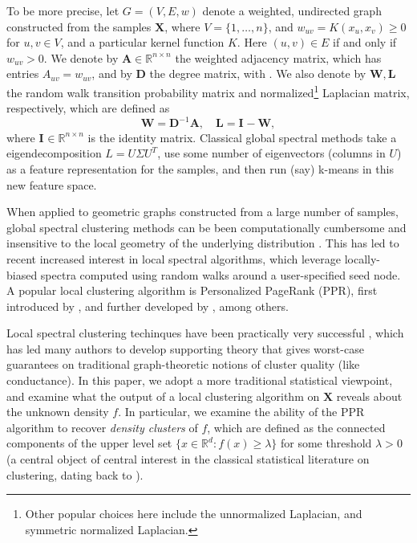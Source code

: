 \documentclass{article}
\newcommand{\Reals}{\mathbb{R}}
\newcommand{\Rd}{\Reals^d}
\newcommand{\1}{\mathbf{1}}
\newcommand{\Abf}{\mathbf{A}}
\newcommand{\Xbf}{\mathbf{X}}
\newcommand{\Wbf}{\mathbf{W}}
\newcommand{\Lbf}{\mathbf{L}}
\newcommand{\Dbf}{\mathbf{D}}
\newcommand{\Ibf}[1]{\mathbf{I}_{#1}}
\theoremstyle{aldenthm}
\theoremstyle{aldenrmrk}
\begin{document}
To be more precise, let $G=(V,E,w)$ denote a weighted, undirected graph  
constructed from the samples $\mathbf{X}$, where $V=\{1,\ldots,n\}$, and $w_{uv}
= K(x_u,x_v) \geq 0$ for $u,v \in V$, and a particular kernel function $K$.
Here $(u,v) \in E$ if and only if $w_{uv} > 0$.  We denote by $\Abf \in
\Reals^{n \times n}$ the weighted adjacency matrix, which has entries
$A_{uv}=w_{uv}$, and by $\Dbf$ the degree matrix, with 
\smash{$\Dbf_{uu} = \sum_{v \in V} \Abf_{uv}$}.  We also denote by $\Wbf,\Lbf$
the random walk transition probability matrix and normalized\footnote{Other
  popular choices here include the unnormalized Laplacian, and symmetric
  normalized Laplacian.} 
Laplacian matrix, respectively, which are defined as
$$
\Wbf = \Dbf^{-1}\Abf, \quad \Lbf = \Ibf{} - \Wbf,
$$
where $\Ibf{} \in \Reals^{n\times n}$ is the identity matrix.  Classical global
spectral methods take a eigendecomposition $L=U \Sigma U^T$, use some 
number of eigenvectors (columns in $U$) as a feature representation for the
samples, and then run (say) k-means in this new feature space.

When applied to geometric graphs constructed from a large number of samples,
global spectral clustering methods can be been computationally cumbersome and   
insensitive to the local geometry of the underlying distribution
\citep{leskovec2010,mahoney2012}.  This has led to recent increased interest in
local spectral algorithms, which leverage locally-biased spectra computed using
random walks around a user-specified seed node.  A popular local clustering
algorithm is Personalized PageRank (PPR), first introduced by
\citet{haveliwala2003}, and further developed by
\citet{spielman2011,spielman2014,andersen2006,mahoney2012,zhu2013},
among others.  

Local spectral clustering techinques have been practically very successful
\citep{leskovec2010,andersen2012,gleich2012,mahoney2012,wu2012}, which has led
many authors to develop supporting theory
\citep{spielman2013,andersen2009,gharan2012,zhu2013} that gives worst-case
guarantees on traditional graph-theoretic notions of cluster quality (like
conductance).  In this paper, we adopt a more traditional statistical viewpoint,
and examine what the output of a local clustering algorithm on $\Xbf$ reveals
about the unknown density $f$.  In particular, we examine the ability of the PPR
algorithm to recover \emph{density clusters} of $f$, which are defined as the
connected components of the upper level set $\{x \in \Rd : f(x) \geq \lambda\}$
for some threshold $\lambda > 0$ (a central object of central interest in the
classical statistical literature on clustering, dating back to
\citealt{hartigan1981}).
\end{document}

